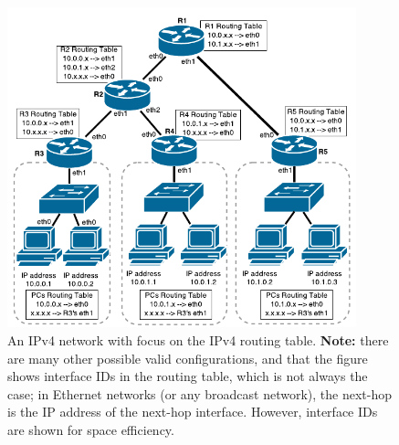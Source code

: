 \documentclass[pdftex,12pt,a4paper]{article}
\begin{document}
            \begin{figure}[tbh]
                \centering
                \includegraphics[width=0.9\textwidth]{figures/cidr}
                \caption{An IPv4 network with focus on the IPv4 routing table.
                \textbf{Note:} there are many other possible valid
                configurations, and that the figure shows interface IDs in the
                routing table, which is not always the case; in Ethernet
                networks (or any broadcast network), the next-hop is the IP address
                of the next-hop interface. However, interface IDs are shown for
                space efficiency.}
                \label{fig:cidr}
            \end{figure}
\end{document}
